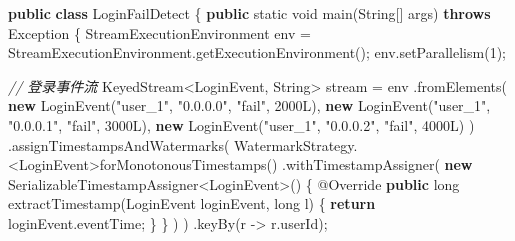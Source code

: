 \documentclass[cn,11pt,chinese]{elegantbook}
\newenvironment{Shaded}{}{}
\newcommand{\AttributeTok}[1]{\textcolor[rgb]{0.49,0.56,0.16}{#1}}
\newcommand{\BuiltInTok}[1]{#1}
\newcommand{\CommentTok}[1]{\textcolor[rgb]{0.38,0.63,0.69}{\textit{#1}}}
\newcommand{\DataTypeTok}[1]{\textcolor[rgb]{0.56,0.13,0.00}{#1}}
\newcommand{\DecValTok}[1]{\textcolor[rgb]{0.25,0.63,0.44}{#1}}
\newcommand{\FunctionTok}[1]{\textcolor[rgb]{0.02,0.16,0.49}{#1}}
\newcommand{\KeywordTok}[1]{\textcolor[rgb]{0.00,0.44,0.13}{\textbf{#1}}}
\newcommand{\NormalTok}[1]{#1}
\newcommand{\StringTok}[1]{\textcolor[rgb]{0.25,0.44,0.63}{#1}}
\begin{document}
\begin{Shaded}
\begin{Highlighting}[]
\KeywordTok{public} \KeywordTok{class}\NormalTok{ LoginFailDetect \{}
    \KeywordTok{public} \DataTypeTok{static} \DataTypeTok{void} \FunctionTok{main}\NormalTok{(}\BuiltInTok{String}\NormalTok{[] args) }\KeywordTok{throws} \BuiltInTok{Exception}\NormalTok{ \{}
\NormalTok{        StreamExecutionEnvironment env = StreamExecutionEnvironment.}\FunctionTok{getExecutionEnvironment}\NormalTok{();}
\NormalTok{        env.}\FunctionTok{setParallelism}\NormalTok{(}\DecValTok{1}\NormalTok{);}
        
        \CommentTok{// 登录事件流}
\NormalTok{        KeyedStream\textless{}LoginEvent, }\BuiltInTok{String}\NormalTok{\textgreater{} stream = env}
\NormalTok{            .}\FunctionTok{fromElements}\NormalTok{(}
                \KeywordTok{new} \FunctionTok{LoginEvent}\NormalTok{(}\StringTok{"user\_1"}\NormalTok{, }\StringTok{"0.0.0.0"}\NormalTok{, }\StringTok{"fail"}\NormalTok{, }\DecValTok{2000L}\NormalTok{),}
                \KeywordTok{new} \FunctionTok{LoginEvent}\NormalTok{(}\StringTok{"user\_1"}\NormalTok{, }\StringTok{"0.0.0.1"}\NormalTok{, }\StringTok{"fail"}\NormalTok{, }\DecValTok{3000L}\NormalTok{),}
                \KeywordTok{new} \FunctionTok{LoginEvent}\NormalTok{(}\StringTok{"user\_1"}\NormalTok{, }\StringTok{"0.0.0.2"}\NormalTok{, }\StringTok{"fail"}\NormalTok{, }\DecValTok{4000L}\NormalTok{)}
\NormalTok{            )}
\NormalTok{            .}\FunctionTok{assignTimestampsAndWatermarks}\NormalTok{(}
\NormalTok{                WatermarkStrategy.\textless{}LoginEvent\textgreater{}}\FunctionTok{forMonotonousTimestamps}\NormalTok{()}
\NormalTok{                .}\FunctionTok{withTimestampAssigner}\NormalTok{(}
                    \KeywordTok{new}\NormalTok{ SerializableTimestampAssigner\textless{}LoginEvent\textgreater{}() \{}
                        \AttributeTok{@Override}
                        \KeywordTok{public} \DataTypeTok{long} \FunctionTok{extractTimestamp}\NormalTok{(LoginEvent loginEvent, }\DataTypeTok{long}\NormalTok{ l) \{}
                            \KeywordTok{return}\NormalTok{ loginEvent.}\FunctionTok{eventTime}\NormalTok{;}
\NormalTok{                        \}}
\NormalTok{                    \}}
\NormalTok{                )}
\NormalTok{            )}
\NormalTok{            .}\FunctionTok{keyBy}\NormalTok{(r {-}\textgreater{} r.}\FunctionTok{userId}\NormalTok{);}
        

\end{Highlighting}
\end{Shaded}
\end{document}

